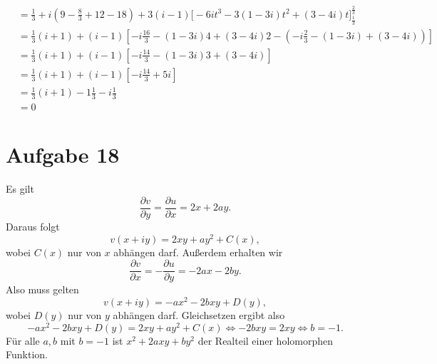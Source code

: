 \documentclass{article}
\theoremstyle{definition}
\newcommand{\equals}{\Longleftrightarrow}
\begin{document}
\begin{enumerate}[(a)]
\begin{align*}
		&= \frac{1}{3} + i \left(9 -\frac{8}{3} + 12 - 18\right)+ 3(i-1)  \bigg[-6it^3 - 3(1-3i)t^2 + (3-4i)t\bigg]_\frac{1}{3}^\frac{2}{3}\\
		&= \frac{1}{3}(i+1) + (i-1) \left[-i \frac{16}{3} -(1-3i)4 + (3-4i)2 - \left(-i \frac{2}{3} -(1-3i) + (3-4i)\right) \right]\\
		&= \frac{1}{3}(i+1) + (i-1) \left[-i \frac{14}{3} -(1-3i)3 + (3-4i)\right]\\
		&= \frac{1}{3}(i+1) + (i-1) \left[-i \frac{14}{3}+5i\right]\\
		&= \frac{1}{3}(i+1) -1\frac{1}{3} - i \frac{1}{3}\\
		&= 0
	\end{align*}
\end{enumerate}

\section*{Aufgabe 18}
Es gilt $$\frac{\partial v}{\partial y} = \frac{\partial u}{\partial x} = 2x + 2ay.$$ Daraus folgt $$v(x + iy) = 2xy + ay^2 + C(x),$$ wobei $C(x)$ nur von $x$ abhängen darf. Außerdem erhalten wir $$\frac{\partial v}{\partial x} = - \frac{\partial u}{\partial y} = - 2ax - 2by.$$
Also muss gelten $$v(x + iy) = -ax^2 - 2bxy + D(y),$$ wobei $D(y)$ nur von $y$ abhängen darf. 
Gleichsetzen ergibt also $$-ax^2 - 2bxy + D(y) = 2xy + ay^2 + C(x) \equals -2bxy = 2xy \equals b = -1.$$
Für alle $a, b$ mit $b = -1$ ist $x^2 + 2axy + by^2$ der Realteil einer holomorphen Funktion.
\end{document}
